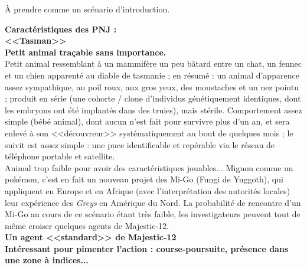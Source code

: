 \documentclass[11pt,twoside,a4paper]{article}
\begin{document}
	{\`A} prendre comme un sc{\'e}nario d'introduction. ~\\


\begin{multicols}{2}

\textbf{\huge Caract{\'e}ristiques des PNJ : }~\\

	\textbf{\Large <<Tasman>>}~\\
	\textbf{Petit animal tra\c{c}able sans importance. }~\\
	Petit animal ressemblant {\`a} un mammif{\`e}re un peu b{\^a}tard entre un chat, un fennec et un chien apparent{\'e} au diable de tasmanie ; en r{\'e}sum{\'e} : un animal d'apparence assez sympathique, au poil roux, aux gros yeux, des moustaches et un nez pointu ; produit en s{\'e}rie (une cohorte / clone d'individus g{\'e}n{\'e}tiquement identiques, dont les embryons ont {\'e}t{\'e} implant{\'e}s dans des truies), mais st{\'e}rile. Comportement assez simple (b{\'e}b{\'e} animal), dont aucun n'est fait pour survivre plus d'un an, et sera enlev{\'e} {\`a} son <<d{\'e}couvreur>> syst{\'e}matiquement au bout de quelques mois ; le suivit est assez simple : une puce identificable et rep{\'e}rable via le r{\'e}seau de t{\'e}l{\'e}phone portable et satellite. ~\\

	Animal trop faible pour avoir des caract{\'e}ristiques jouables... Mignon comme un pok{\'e}mon, c'est en fait un nouveau projet des Mi-Go (Fungi de Yuggoth), qui appliquent en Europe et en Afrique (avec l'interpr{\'e}tation des autorit{\'e}s locales) leur exp{\'e}rience des \emph{Greys} en Am{\'e}rique du Nord. La probabilit{\'e} de rencontre d'un Mi-Go au cours de ce sc{\'e}nario {\'e}tant tr{\`e}s faible, les investigateurs peuvent tout de m{\^e}me croiser quelques agents de Majestic-12. ~\\


	\textbf{\large Un agent <<standard>> de Majestic-12}~\\
	\textbf{Int{\'e}ressant pour pimenter l'action : course-poursuite, pr{\'e}sence dans une zone {\`a} indices...} ~\\
	

\end{multicols}
\end{document}
